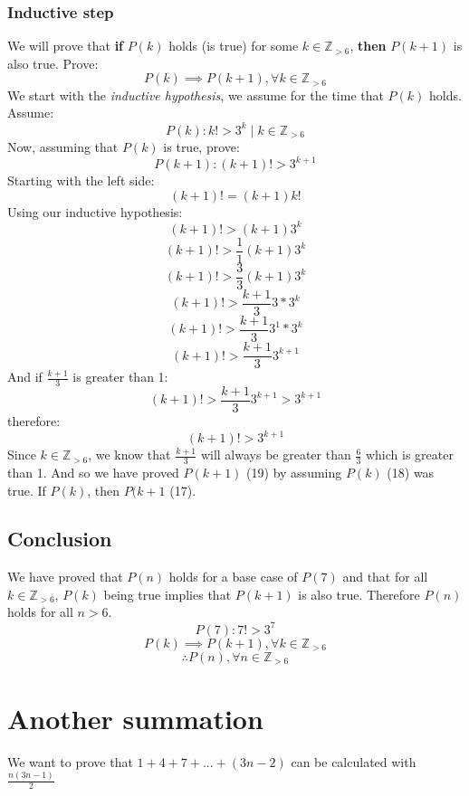 \documentclass{article}
\begin{document}
\subsubsection{Inductive step}
We will prove that \textbf{if} $P(k)$ holds (is true) for some $k \in \mathbb Z_{> 6}$, \textbf{then} $P(k + 1)$ is also true. Prove:
\begin{equation}
P(k) \implies P(k + 1), \forall k \in \mathbb Z_{> 6}
\end{equation}
We start with the \textit{inductive hypothesis}, we assume for the time that $P(k)$ holds. Assume:
\begin{equation}
P(k): k! > 3^k \mid k \in \mathbb Z_{> 6}
\end{equation}
Now, assuming that $P(k)$ is true, prove:
\begin{equation}
P(k + 1): (k + 1)! > 3^{k + 1}
\end{equation}
Starting with the left side:
\[ (k + 1)! = (k + 1) k! \]
Using our inductive hypothesis:
\[ (k + 1)! > (k + 1) 3^k \]
\[ (k + 1)! > \frac{1}{1} (k + 1) 3^k \]
\[ (k + 1)! > \frac{3}{3} (k + 1) 3^k \]
\[ (k + 1)! > \frac{k + 1}{3} 3 * 3^k \]
\[ (k + 1)! > \frac{k + 1}{3} 3^1 * 3^k \]
\[ (k + 1)! > \frac{k + 1}{3} 3^{k + 1} \]
And if $\frac{k + 1}{3}$ is greater than 1:
\[ (k + 1)! > \frac{k + 1}{3} 3^{k + 1} > 3^{k + 1} \]
therefore:
\[ (k + 1)! > 3^{k + 1} \]
Since $k \in \mathbb Z_{> 6}$, we know that $\frac{k + 1}{3}$ will always be greater than $\frac{6}{3}$ which is greater than 1.
And so we have proved $P(k + 1)$ (19) by assuming $P(k)$ (18) was true. If $P(k)$, then $P(k + 1$ (17).

\subsection{Conclusion}
We have proved that $P(n)$ holds for a base case of $P(7)$ and that for all $k \in \mathbb Z_{> 6}$, $P(k)$ being true implies that $P(k + 1)$ is also true. Therefore $P(n)$ holds for all $n > 6$.
\[P(7): 7! > 3^7 \]
\[P(k) \implies P(k + 1), \forall k \in  \mathbb Z_{> 6}\]
\[ \therefore P(n), \forall n \in \mathbb Z_{> 6} \]



\section{Another summation}
We want to prove that $ 1 + 4 + 7 + ... + (3n - 2) $ can be calculated with $ \frac{n(3n - 1)}{2} $
\end{document}
